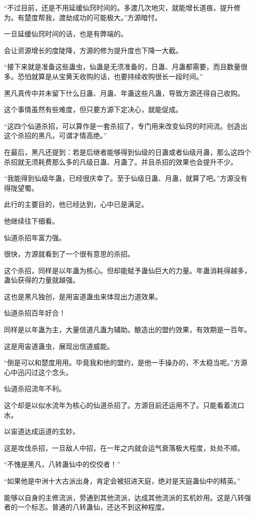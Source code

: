 \begin{this_body}
“不过目前，还是不用延缓仙窍时间的。多渡几次地灾，就能增长道痕，提升修为。有楚度帮我，渡劫成功的可能极大。”方源暗忖。

一旦延缓仙窍时间的话，也是有弊端的。

会让资源增长的度陡降，方源的修为提升度也下降一大截。

“接下来就是准备这些蛊虫，仙蛊是无须准备的，日蛊、月蛊都需要，而且数量很多。恐怕就算是从宝黄天收购的话，也要持续收购很长一段时间。”

黑凡真传中并未留下什么日蛊、月蛊、年蛊这些凡蛊，导致方源还得自己收购。

这个事情虽然有些难度，但只要方源下定决心，就能促成。

“这四个仙道杀招，可以算作是一套杀招了，专门用来改变仙窍的时间流。创造出这个杀招的黑凡，可谓才情高绝。”

在最后，黑凡还提到：若是后继者能够得到仙级的日蛊或者仙级月蛊，那么这四个杀招就无须耗费那么多的凡级日蛊、月蛊了。并且杀招的效果也会提升不少。

“我能得到仙级年蛊，已经很庆幸了。至于仙级日蛊、月蛊，就算了吧。”方源没有得陇望蜀。

此行的主要目的，他已经达到，心中已是满足。

他继续往下细看。

仙道杀招年富力强。

很快，方源就看到了一个很有意思的杀招。

这个杀招，同样是以年蛊为核心。但却能赋予蛊仙巨大的力量。年蛊消耗得越多，蛊仙获得的力量就越强。

这也是黑凡独创，是用宙道蛊虫来体现出力道效果。

仙道杀招百年好合！

同样是以年蛊为主，大量信道凡蛊为辅助。酿造出的盟约效果，有效期是一百年。

这是用宙道蛊虫，展现出信道威能。

“倒是可以和楚度用用。毕竟我和他的盟约，是他一手操办的，不太稳当呢。”方源心中迅闪过这个念头。

仙道杀招流年不利。

这个却是以似水流年为核心的仙道杀招了。方源目前还运用不了。只能看着流口水。

以宙道达成运道的玄妙。

这是攻伐杀招，一旦敌人中招，在一年之内就会运气衰落极大程度，处处不顺。

“不愧是黑凡，八转蛊仙中的佼佼者！”

“如果他是中洲十大古派出身，肯定会被招进天庭，绝对是天庭蛊仙中的精英。”

能够以自身的主修流派，旁通到其他流派，达成其他流派的玄机妙用。这是八转强者的一个标志。普通的八转蛊仙，还达不到这种程度。


\end{this_body}
